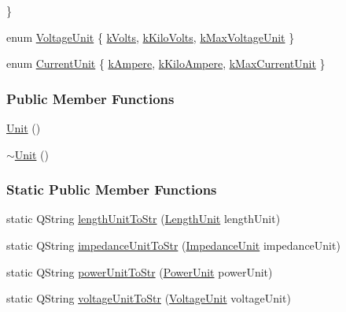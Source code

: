 \begin{DoxyCompactItemize}
 \}
\item 
enum \hyperlink{class_unit_a55b07dfa9457e1eca2c7194fe0cfc3c1}{Voltage\+Unit} \{ \hyperlink{class_unit_a55b07dfa9457e1eca2c7194fe0cfc3c1aa54b2473993a702a3923525765bd6e4c}{k\+Volts}, 
\hyperlink{class_unit_a55b07dfa9457e1eca2c7194fe0cfc3c1a35a201a658c2cd89766787c657e9a54d}{k\+Kilo\+Volts}, 
\hyperlink{class_unit_a55b07dfa9457e1eca2c7194fe0cfc3c1acd70db01fb079b3dada6c527cf0407d0}{k\+Max\+Voltage\+Unit}
 \}
\item 
enum \hyperlink{class_unit_a0794cf6c9682f48296dd4a5315389787}{Current\+Unit} \{ \hyperlink{class_unit_a0794cf6c9682f48296dd4a5315389787a368a3c470f0b590a6100dda717a7dd4f}{k\+Ampere}, 
\hyperlink{class_unit_a0794cf6c9682f48296dd4a5315389787aa27cb5edd73099f24f2285e02396ae14}{k\+Kilo\+Ampere}, 
\hyperlink{class_unit_a0794cf6c9682f48296dd4a5315389787aeb1fd2a24bcda443e3c3d91c525134c8}{k\+Max\+Current\+Unit}
 \}
\end{DoxyCompactItemize}
\subsubsection*{Public Member Functions}
\begin{DoxyCompactItemize}
\item 
\hyperlink{class_unit_a8e46f663a95736c8002d85ab271a7581}{Unit} ()
\item 
\hyperlink{class_unit_a6353fc4c0a329997ad4abcf0dcb4eb27}{$\sim$\+Unit} ()
\end{DoxyCompactItemize}
\subsubsection*{Static Public Member Functions}
\begin{DoxyCompactItemize}
\item 
static Q\+String \hyperlink{class_unit_abd363319f79f97b0a0b9a08c5ddc3cdb}{length\+Unit\+To\+Str} (\hyperlink{class_unit_a8c8921f7b225ad6063b1cb573425b9a0}{Length\+Unit} length\+Unit)
\item 
static Q\+String \hyperlink{class_unit_ae3ca20f4b6530f04ca6aa138ec0fa7d2}{impedance\+Unit\+To\+Str} (\hyperlink{class_unit_a3747e779c805df24a71961290be3fbdf}{Impedance\+Unit} impedance\+Unit)
\item 
static Q\+String \hyperlink{class_unit_ad1487441b5a7eb93a3eb0aeebe947725}{power\+Unit\+To\+Str} (\hyperlink{class_unit_ace265ae255370ccacfd5370337572c3b}{Power\+Unit} power\+Unit)
\item 
static Q\+String \hyperlink{class_unit_a7fa103c31f9f069961b35b6371ff0c0a}{voltage\+Unit\+To\+Str} (\hyperlink{class_unit_a55b07dfa9457e1eca2c7194fe0cfc3c1}{Voltage\+Unit} voltage\+Unit)
\end{DoxyCompactItemize}


